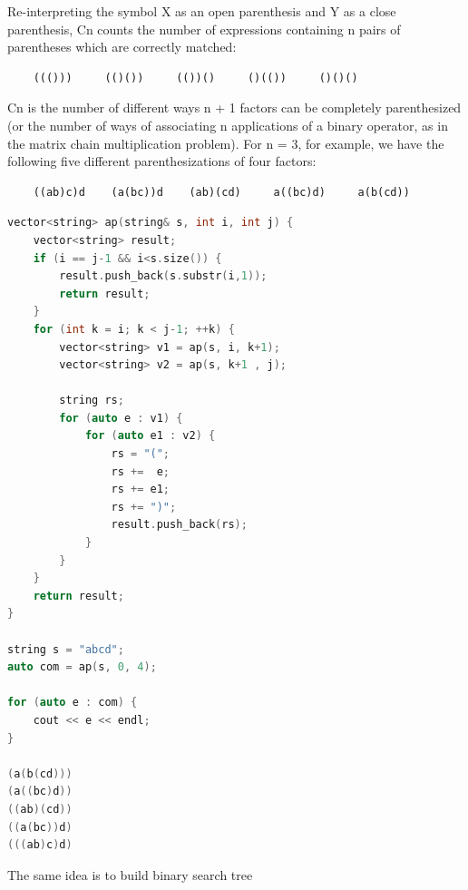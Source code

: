 \documentclass[a4paper,11pt,twoside]{book}
\begin{document}
	\par Re-interpreting the symbol X as an open parenthesis and Y as a close parenthesis, Cn counts the number of expressions containing n pairs of parentheses which are correctly matched:
\begin{lstlisting}
	((()))     (()())     (())()     ()(())     ()()()
\end{lstlisting}	
	
	Cn is the number of different ways n + 1 factors can be completely parenthesized (or the number of ways of associating n applications of a binary operator, as in the matrix chain multiplication problem). For n = 3, for example, we have the following five different parenthesizations of four factors:
	
\begin{lstlisting}	
	((ab)c)d    (a(bc))d    (ab)(cd)     a((bc)d)     a(b(cd))
\end{lstlisting}	
	
\begin{lstlisting}[frame=single, language=c++]
vector<string> ap(string& s, int i, int j) {
	vector<string> result;
	if (i == j-1 && i<s.size()) {
		result.push_back(s.substr(i,1));
		return result;
	}
	for (int k = i; k < j-1; ++k) {
		vector<string> v1 = ap(s, i, k+1);
		vector<string> v2 = ap(s, k+1 , j);
		
		string rs;
		for (auto e : v1) {
			for (auto e1 : v2) {
				rs = "(";
				rs +=  e;
				rs += e1;
				rs += ")";
				result.push_back(rs);
			}
		}
	}
	return result;
}

string s = "abcd";
auto com = ap(s, 0, 4);

for (auto e : com) {
	cout << e << endl;
}

(a(b(cd)))
(a((bc)d))
((ab)(cd))
((a(bc))d)
(((ab)c)d)	
\end{lstlisting}	
	
	\par The same idea is to build binary search tree
	
\end{document}
